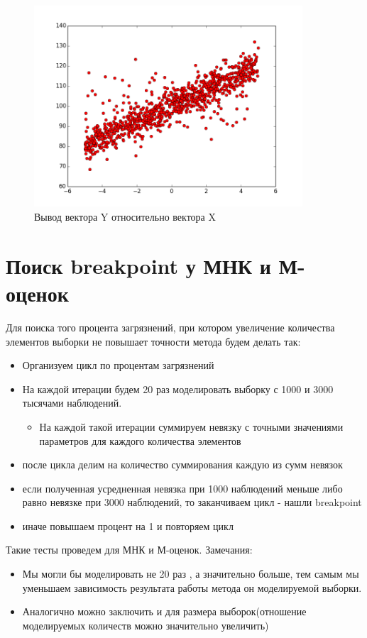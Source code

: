 \documentclass[12pt]{article}
\begin{document}
\begin{figure}[hb!]
    \centering
    \includegraphics[width=100mm]{graphic.png}
    \caption{Вывод вектора Y относительно вектора X\label{overflow}}
\end{figure}
\newpage
\section{Поиск breakpoint у МНК и М-оценок}
Для поиска того процента загрязнений, при котором увеличение количества элементов выборки не повышает точности метода будем делать так:\hfill\break
\begin{itemize}
    \item Организуем цикл по процентам загрязнений\\
    \item На каждой итерации будем 20 раз моделировать выборку с 1000 и 3000 тысячами наблюдений.
        \begin{itemize}
            \item На каждой такой итерации суммируем невязку с точными значениями параметров для каждого количества элементов\\
        \end{itemize}
    \item после цикла делим на количество суммирования каждую из сумм невязок\\
    \item если полученная усредненная невязка при 1000 наблюдений меньше либо равно невязке при 3000 наблюдений, то заканчиваем цикл - нашли breakpoint\\
    \item иначе повышаем процент на 1 и повторяем цикл
\end{itemize}
Такие тесты проведем для МНК и М-оценок.\hfill\break
Замечания:\hfill\break
\begin{itemize}
    \item Мы могли бы моделировать не 20 раз , а значительно больше, тем самым мы уменьшаем зависимость результата работы метода он моделируемой выборки.\\
    \item Аналогично можно заключить и для размера выборок(отношение моделируемых количеств можно значительно увеличить)
\end{itemize}
\end{document}
